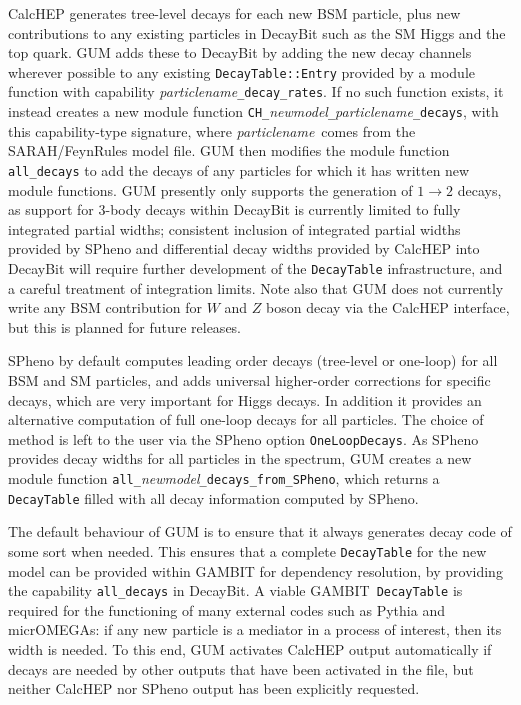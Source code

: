 \documentclass[pdftex,twocolumn,epjc3_preprint,runningheads]{svjour3}
\renewcommand{\_}{\discretionary{\underscore}{}{\underscore}}
\newcommand\cpp[1]{{\lstinline!#1!}}  %
\newcommand\yaml[1]{{\lstset{style=yaml}\lstinline!#1!\lstset{style=cpp}}}
\newcommand\term[1]{{\lstset{style=terminal}\lstinline!#1!\lstset{style=cpp}}}
\newcommand{\metavarf}[1]{\textit{\color{darkgreen}\footnotesize\textrm{#1}}}
\newcommand{\metavar}{\metavarf}
\newcommand{\gambit}{\textsf{GAMBIT}\xspace}
\newcommand{\decaybit}{\textsf{DecayBit}\xspace}
\newcommand{\GB}{\gambit}
\newcommand{\pythia}{\textsf{Pythia}\xspace}
\newcommand{\mo}{\micromegas}
\newcommand{\micromegas}{\textsf{micrOMEGAs}\xspace}
\newcommand{\gum}{\textsf{GUM}\xspace}
\newcommand{\dgum}{\!\!\term{.gum}\!\xspace}
\newcommand{\fr}{\textsf{FeynRules}\xspace}
\newcommand{\sarah}{\textsf{SARAH}\xspace}
\newcommand{\CH}{\textsf{CalcHEP}\xspace}
\newcommand{\spheno}{\textsf{SPheno}\xspace}
\newcommand{\nm}{\metavar{new\_model}}
\newcommand{\pn}{\metavar{particle\_name}}
\begin{document}
\CH generates tree-level decays for each new BSM particle, plus new contributions to any existing particles in \decaybit such as the SM Higgs and the top quark. \gum adds these to \decaybit by adding the new decay channels wherever possible to any existing \cpp{DecayTable::Entry} provided by a module function with capability \pn\cpp{_decay_rates}.  If no such function exists, it instead creates a new module function \cpp{CH_}\nm\cpp{_}\pn\cpp{_decays}, with this capability-type signature, where \pn\ comes from the \sarah/\fr model file. \gum then modifies the module function \cpp{all_decays} to add the decays of any particles for which it has written new module functions.  \gum presently only supports the generation of $1\to 2$ decays, as support for 3-body decays within \decaybit is currently limited to fully integrated partial widths; consistent inclusion of integrated partial widths provided by \spheno and differential decay widths provided by \CH into \decaybit will require further development of the \cpp{DecayTable} infrastructure, and a careful treatment of integration limits. Note also that \gum does not currently write any BSM contribution for $W$ and $Z$ boson decay via the \CH interface, but this is planned for future releases.

\spheno by default computes leading order decays (tree-level or one-loop) for all BSM and SM particles, and adds universal higher-order corrections for specific decays, which are very important for Higgs decays. In addition it provides an alternative computation of full one-loop decays for all particles. The choice of method is left to the user via the \spheno option \yaml{OneLoopDecays}. As \spheno provides decay widths for all particles in the spectrum, \gum creates a new module function \cpp{all_}\nm\cpp{_decays_from_SPheno}, which returns a \cpp{DecayTable} filled with all decay information computed by \spheno.

The default behaviour of \gum is to ensure that it always generates decay code of some sort when needed. This ensures that a complete \cpp{DecayTable} for the new model can be provided within \GB for dependency resolution, by providing the capability \cpp{all_decays} in \decaybit. A viable \GB\ \cpp{DecayTable} is required for the functioning of many external codes such as \pythia and \mo: if any new particle is a mediator in a process of interest, then its width is needed.  To this end, \gum activates \CH output automatically if decays are needed by other outputs that have been activated in the \dgum file, but neither \CH nor \spheno output has been explicitly requested.
\end{document}
